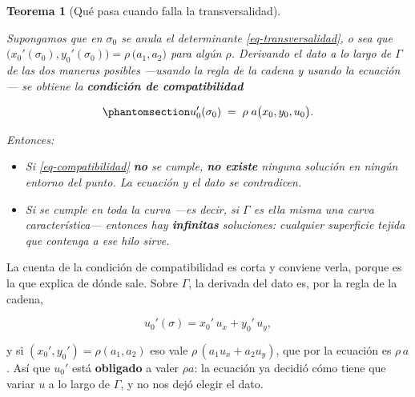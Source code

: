 \documentclass[
  spanish,
  a4paper,
]{scrbook}
\providecommand{\tightlist}{%
  \setlength{\itemsep}{0pt}\setlength{\parskip}{0pt}}
\theoremstyle{definition}
\theoremstyle{plain}
\theoremstyle{definition}
\theoremstyle{plain}
\newtheorem{theorem}{Teorema}[chapter]
\theoremstyle{definition}
\theoremstyle{remark}
\begin{document}
\begin{theorem}[Qué pasa cuando falla la
transversalidad]\protect\hypertarget{thm-degenerado}{}\label{thm-degenerado}

Supongamos que en \(\sigma_0\) se anula el determinante
\ref{eq-transversalidad}, o sea que
\(\big(x_0'(\sigma_0), y_0'(\sigma_0)\big) = \rho\,\big(a_1, a_2\big)\)
para algún \(\rho\). Derivando el dato a lo largo de \(\Gamma\) de las
dos maneras posibles ---usando la regla de la cadena y usando la
ecuación--- se obtiene la \textbf{condición de compatibilidad}

\begin{equation}\protect\phantomsection\label{eq-compatibilidad}{
u_0'(\sigma_0) \;=\; \rho\; a\big(x_0,y_0,u_0\big) .
}\end{equation}

Entonces:

\begin{itemize}
\tightlist
\item
  Si \ref{eq-compatibilidad} \textbf{no} se cumple, \textbf{no existe}
  ninguna solución en ningún entorno del punto. La ecuación y el dato se
  contradicen.
\item
  Si se cumple en toda la curva ---es decir, si \(\Gamma\) es ella misma
  una curva característica--- entonces hay \textbf{infinitas}
  soluciones: cualquier superficie tejida que contenga a ese hilo sirve.
\end{itemize}

\end{theorem}

La cuenta de la condición de compatibilidad es corta y conviene verla,
porque es la que explica de dónde sale. Sobre \(\Gamma\), la derivada
del dato es, por la regla de la cadena,

\[
u_0'(\sigma) = x_0'\,u_x + y_0'\,u_y ,
\]

y si \((x_0',y_0') = \rho(a_1,a_2)\) eso vale
\(\rho\,(a_1u_x + a_2u_y)\), que por la ecuación es \(\rho\,a\). Así que
\(u_0'\) está \textbf{obligado} a valer \(\rho a\): la ecuación ya
decidió cómo tiene que variar \(u\) a lo largo de \(\Gamma\), y no nos
dejó elegir el dato.
\end{document}
